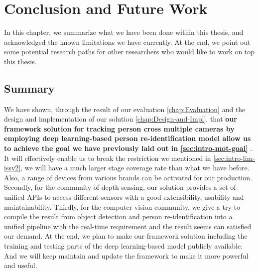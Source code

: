 \chapter{Conclusion and Future Work}
\label{chap:Conclusion}

In this chapter, we summarize what we have been done within this
thesis, and acknowledged the known limitations we have currently.
At the end, we point out some potential research paths for other
researchers who would like to work on top this thesis.


\section{Summary}
\label{sec:Conclusion-summary}

We have shown, through the result of our evaluation \autoref{chap:Evaluation}
and the design and implementation of our solution
\autoref{chap:Design-and-Impl}, that
\textbf{
our framework solution for tracking person cross multiple cameras by employing
deep learning-based person re-identification model allow us to achieve the goal
we have previously laid out in \autoref{sec:intro-mot-goal}
}.
It will effectively enable us to break the restriction we mentioned in
\autoref{sec:intro-lim-issv2}, we will have a much larger stage coverage rate than
what we have before. Also, a range of devices from various brands can be
activated for our production.
Secondly, for the community of depth sensing, our solution provides a set of
unified APIs to access different sensors with a good extensibility, usability
and maintainability.
Thirdly, for the computer vision community, we give a try to compile the result
from object detection and person re-identification into a unified pipeline with
the real-time requirement and the result seems can satisfied our demand.
At the end, we plan to make our framework solution including the training and
testing parts of the deep learning-based model publicly available. And we will
keep maintain and update the framework to make it more powerful and useful.


